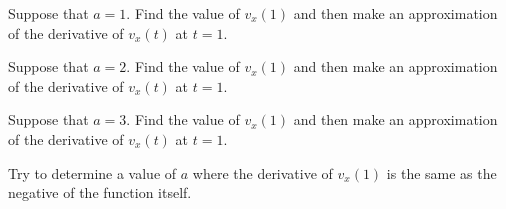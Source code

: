 \begin{problem}
  \begin{subproblem}
  \item Suppose that $a=1$. Find the value of $v_x(1)$ and then make
    an approximation of the derivative of $v_x(t)$ at $t=1$.  
    \vfill
    \item Suppose that $a=2$. Find the value of $v_x(1)$ and then make
    an approximation of the derivative of $v_x(t)$ at $t=1$.  
    \vfill
    \item Suppose that $a=3$. Find the value of $v_x(1)$ and then make
    an approximation of the derivative of $v_x(t)$ at $t=1$.  
    \vfill
    \item Try to determine a value of $a$ where the derivative of
      $v_x(1)$ is the same as the negative of the function itself.
      \vfill
  \end{subproblem}


\end{problem}

